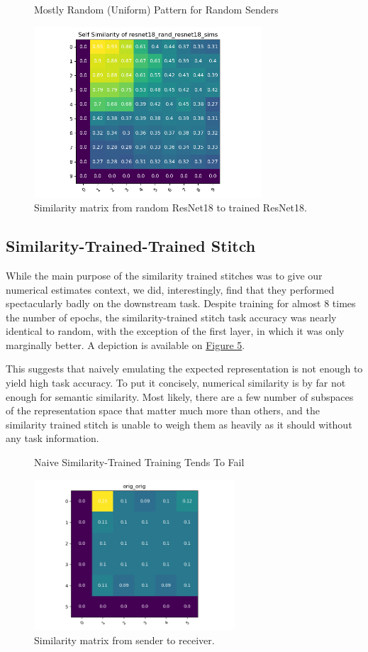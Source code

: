 \documentclass{article} %
\begin{document}
\label{Figure4}
\begin{center}
   \begin{figure}[h!]
      \centering
      \caption{Mostly Random (Uniform) Pattern for Random Senders}
      \includegraphics[width=8.5cm]{resnet18_rand_resnet18_sims.png}
      \caption*{Similarity matrix from random ResNet18 to trained ResNet18.}
   \end{figure}
\end{center}

\subsection*{Similarity-Trained-Trained Stitch}
While the main purpose of the similarity trained stitches was to give our numerical estimates context,
we did, interestingly, find that they performed spectacularly badly on the downstream task. Despite training
for almost 8 times the number of epochs, the similarity-trained stitch task accuracy was nearly identical
to random, with the exception of the first layer, in which it was only marginally better. A depiction
is available on \hyperref[Figure5]{Figure 5}.

This suggests that naively emulating the expected representation is not enough to yield high task accuracy.
To put it concisely, numerical similarity is by far not enough for semantic similarity. Most likely,
there are a few number of subspaces of the representation space that matter much more than others, and the similarity
trained stitch is unable to weigh them as heavily as it should without any task information.

\label{Figure5}
\begin{center}
   \begin{figure}[h!]
      \centering
      \caption{Naive Similarity-Trained Training Tends To Fail}
      \includegraphics[width=7.5cm]{resnet1111_1111_autoencoder.png}
      \caption*{Similarity matrix from sender to receiver.}
   \end{figure}
\end{center}
\end{document}

